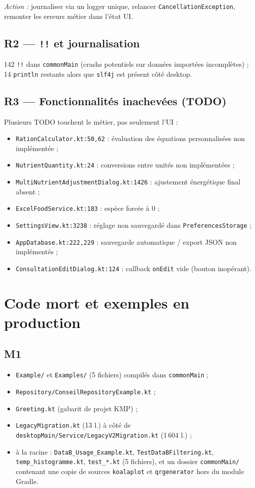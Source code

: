 \documentclass[11pt,a4paper]{article}
\newcommand{\code}[1]{\texttt{#1}}
\newcommand{\prio}[1]{\textbf{\textcolor{#1}{\textbullet}}}
\begin{document}
\emph{Action :} journaliser via un logger unique, relancer \code{CancellationException},
remonter les erreurs métier dans l'état UI.

\subsection*{\prio{orange} R2 --- \code{!!} et journalisation}
142 \code{!!} dans \code{commonMain} (crashs potentiels sur données importées incomplètes) ;
14 \code{println} restants alors que \code{slf4j} est présent côté desktop.

\subsection*{\prio{orange} R3 --- Fonctionnalités inachevées (TODO)}
Plusieurs TODO touchent le métier, pas seulement l'UI :
\begin{itemize}
  \item \code{RationCalculator.kt:50,62} : évaluation des équations personnalisées non implémentée ;
  \item \code{NutrientQuantity.kt:24} : conversions entre unités non implémentées ;
  \item \code{MultiNutrientAdjustmentDialog.kt:1426} : ajustement énergétique final absent ;
  \item \code{ExcelFoodService.kt:183} : espèce forcée à 0 ;
  \item \code{SettingsView.kt:3238} : réglage non sauvegardé dans \code{PreferencesStorage} ;
  \item \code{AppDatabase.kt:222,229} : sauvegarde automatique / export JSON non implémentés ;
  \item \code{ConsultationEditDialog.kt:124} : callback \code{onEdit} vide (bouton inopérant).
\end{itemize}

\section{Code mort et exemples en production}
\subsection*{\prio{orange} M1}
\begin{itemize}
  \item \code{Example/} et \code{Examples/} (5 fichiers) compilés dans \code{commonMain} ;
  \item \code{Repository/ConseilRepositoryExample.kt} ;
  \item \code{Greeting.kt} (gabarit de projet KMP) ;
  \item \code{LegacyMigration.kt} (13 l.) à côté de \code{desktopMain/Service/LegacyV2Migration.kt} (1\,604 l.) ;
  \item à la racine : \code{DataB\_Usage\_Example.kt}, \code{TestDataBFiltering.kt}, \code{temp\_histogramme.kt},
        \code{test\_*.kt} (5 fichiers), et un dossier \code{commonMain/} contenant une copie de
        sources \code{koalaplot} et \code{qrgenerator} hors du module Gradle.
\end{itemize}
\end{document}
